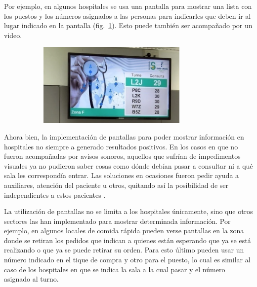 \documentclass{article}
\begin{document}
Por ejemplo, en algunos hospitales se usa una pantalla para mostrar una lista con los puestos y los números asignados a las personas para indicarles que deben ir al lugar indicado en la pantalla (fig.~\ref{fig:hospital}). Esto puede también ser acompañado por un video. 
\begin{figure}[H]
	\caption{Hospital con pantalla para distribuir pacientes}
    \begin{subfigure}{1.0\textwidth}
	\includegraphics[width=0.8\textwidth]{hospital.png}
    \end{subfigure}
	\label{fig:hospital}
\end{figure}
\vspace{-1.0\baselineskip}
Ahora bien, la implementación de pantallas para poder mostrar información en hospitales no siempre a generado resultados positivos. En los casos en que no fueron acompañadas por avisos sonoros, aquellos que sufrían de impedimentos visuales ya no pudieron saber cosas como dónde debían pasar a consultar ni a qué sala les correspondía entrar. Las soluciones en ocasiones fueron pedir ayuda a auxiliares, atención del paciente u otros, quitando así la posibilidad de ser independientes a estos pacientes \parencite{pantallasChange}.

La utilización de pantallas no se limita a los hospitales únicamente, sino que otros sectores las han implementado para mostrar determinada información. Por ejemplo, en algunos locales de comida rápida pueden verse pantallas en la zona donde se retiran los pedidos que indican a quienes están esperando que ya se está realizando o que ya se puede retirar su orden. Para esto último pueden usar un número indicado en el tique de compra y otro para el puesto, lo cual es similar al caso de los hospitales en que se indica la sala a la cual pasar y el número asignado al turno.
\end{document}
